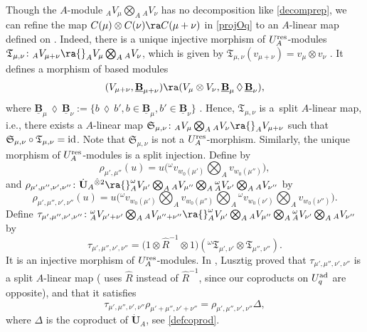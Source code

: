Though the $A$-module ${}_AV_\mu \bigotimes_A {}_AV_\nu$ has no decomposition like \eqref{decomprep}, we can refine the map $C(\mu) \otimes C(\nu) \ra C(\mu+\nu)$ in \eqref{projOq} to an $A$-linear map defined on . Indeed, there is a unique injective morphism of $U_A^{\rm res}$-modules $\mathfrak{T}_{\mu,\nu}\colon{}_AV_{\mu+\nu}\ra {}_AV_\mu \bigotimes_A {}_AV_\nu$, which is given by $\mathfrak{T}_{\mu,\nu}(v_{\mu+\nu}) = v_{\mu} \otimes v_{\nu}$ \cite[Proposition 25.1.2\,(a)--(b)]{Lusztig}. It defines a morphism of based modules
\[(V_{\mu+\nu},\underline{\mathbf{B}}_{\mu+\nu}) \ra (V_\mu \otimes V_\nu ,\underline{\mathbf{B}}_{\mu} \,\lozenge\, \underline{\mathbf{B}}_\nu),
\]
where $\underline{\mathbf{B}}_{\mu} \,\lozenge\, \underline{\mathbf{B}}_\nu := \{b\,\lozenge\, b', b\in \underline{\mathbf{B}}_{\mu}, b'\in \underline{\mathbf{B}}_{\nu} \}$ \cite[Proposition~27.1.7]{Lusztig}. Hence, $\mathfrak{T}_{\mu,\nu}$ is a~split $A$-li\-near map, i.e., there exists a $A$-linear map $\mathfrak{S}_{\mu,\nu}\colon {}_AV_\mu \bigotimes_A {}_AV_\nu \ra {}_AV_{\mu+\nu} $ such that ${\mathfrak{S}_{\mu,\nu}\circ \mathfrak{T}_{\mu,\nu} ={\rm id}}$. Note that $\mathfrak{S}_{\mu,\nu}$ is not a $U_A^{\rm res}$-morphism. Similarly, the unique morphism of $U_A^{\rm res}$-modules  is a split injection. Define  by
\[
\rho_{\mu',\mu''}(u)= u\biggl({}^\omega v_{w_0(\mu')}\bigotimes_A v_{w_0(\mu'')}\biggr),\]
and $\rho_{\mu',\mu'',\nu',\nu''}\colon \dot{\mathbf{U}}_A{}^{ \hat{\otimes}2} \ra {}_A^\omega V_{\mu'} \bigotimes_A {}_AV_{\mu''} \bigotimes_A {}_A^\omega V_{\nu'} \bigotimes_A {}_AV_{\nu''}$ by
\[\rho_{\mu',\mu'',\nu',\nu''}(u)= u\biggl({}^\omega v_{w_0(\mu')}\bigotimes_A v_{w_0(\mu'')}\bigotimes_A {}^\omega v_{w_0(\nu')}\bigotimes_A v_{w_0(\nu'')}\biggr).\]
Define $\tau_{\mu',\mu'',\nu',\nu''}\colon {}_A^\omega V_{\mu'+\nu'} \bigotimes_A {}_AV_{\mu''+\nu''} \ra {}_A^\omega V_{\mu'} \bigotimes_A {}_AV_{\mu''} \bigotimes_A {}_A^\omega V_{\nu'} \bigotimes_A {}_AV_{\nu''}$ by
\[\tau_{\mu',\mu'',\nu',\nu''} = \big(1\otimes \hat{R}^{-1} \otimes 1\big)({}^\omega \mathfrak{T}_{\mu',\nu'} \otimes \mathfrak{T}_{\mu'',\nu''}).\]
It is an injective morphism of $U_A^{\rm res}$-modules. In \cite[Section 1.13]{Lusztig3}, Lusztig proved that $\tau_{\mu',\mu'',\nu',\nu''}$ is a split $A$-linear map (\cite{Lusztig3} uses $\hat{R}$ instead of $\hat{R}^{-1}$, since our coproducts on $U_q^{\rm ad}$ are opposite), and that it satisfies{\samepage
\begin{equation}\label{commutdiagLusztig}
\tau_{\mu',\mu'',\nu',\nu''} \rho_{\mu'+\mu'',\nu'+\nu''} = \rho_{\mu',\mu'',\nu',\nu''}\Delta,
\end{equation}
where $\Delta$ is the coproduct of $\dot{\mathbf{U}}_A$, see \eqref{defcoprod}.}

